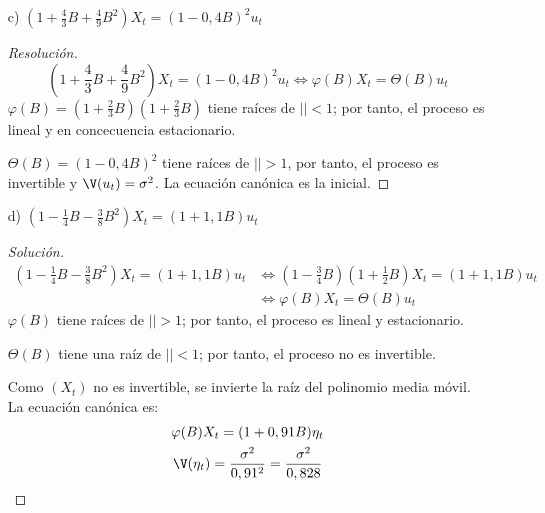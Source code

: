 \begin{ejemplo}
\begin{enumerate}
\begin{proof}[Resoluci\'{o}n]
La ecuaci\'{o}n can\'{o}nica es:
\begin{gather*}
 Z_{t} =(1+0,91B)\eta_{t}\qquad (\eta_{t}\text{ es la innovaci\'{o}n})\\
 \V(\eta_{t} )=\frac{\sigma^{2}}{\left| z \right|^{2}}=\frac{\sigma ^{2}}{0,91^{2}}=\frac{\sigma^{2}}{0,828}
\end{gather*}
\end{proof}

\item[c)] $\left(1+\frac{4}{3}B+\frac{4}{9}B^{2}\right)X_{t} =(1-0,4B)^{2}u_{t} $

\begin{proof}[Resoluci\'{o}n]

\[
\left(1+\frac{4}{3}B+\frac{4}{9}B^{2}\right)X_{t} =(1-0,4B)^{2}u_{t} 
\Longleftrightarrow \varphi (B)X_{t} =\Theta (B)u_{t} 
\]
$\varphi (B)=\left(1+\frac{2}{3}B\right)\left(1+\frac{2}{3}B\right)$ tiene ra\'{i}ces de $\left| \right|< 1$; por tanto, el proceso es lineal y en concecuencia estacionario.\newline

$\Theta (B)=(1-0,4B)^{2}$ tiene ra\'{i}ces de $\left| \right|> 1$, por tanto, el proceso es invertible y $\V(u_{t} )=\sigma^{2}$. La ecuaci\'{o}n can\'{o}nica es la inicial. 
\end{proof}

\item[d)] $\left(1-\frac{1}{4}B-\frac{3}{8}B^{2}\right)X_{t} =(1+1,1B)u_{t} $ 
\begin{proof}[Soluci\'{o}n]
\begin{align*}
\left(1-\frac{1}{4}B-\frac{3}{8}B^{2}\right)X_{t} =(1+1,1B)u_{t}
	& \Leftrightarrow \left(1-\frac{3}{4}B\right)\left(1+\frac{1}{2}B\right)X_{t} =(1+1,1B)u_{t}\\
	& \Leftrightarrow \varphi(B)X_{t} =\Theta (B)u_{t} 
\end{align*}
$\varphi (B)$ tiene ra\'{i}ces de $\left| \right|> 1$; por tanto, el proceso es lineal y estacionario.\newline

$\Theta (B)$ tiene una ra\'{i}z de $\left| \right|< 1$; por tanto, el proceso no es invertible.\newline

Como $(X_{t} )$ no es invertible, se invierte la ra\'{i}z del polinomio media m\'{o}vil. La ecuaci\'{o}n can\'{o}nica es:
\begin{gather*}
\varphi (B)X_{t} =(1+0,91B)\eta_{t} 
\\
\V(\eta_{t} )=\frac{\sigma^{2}}{0,91^{2}}=\frac{\sigma^{2}}{0,828}
\end{gather*}
\end{proof}


\end{enumerate}
\end{ejemplo}
